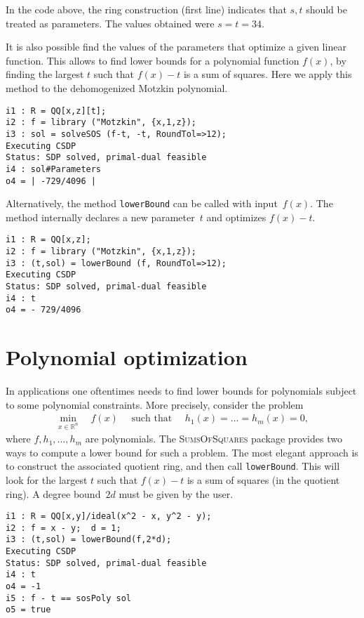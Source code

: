 \documentclass[11pt]{amsart}
\theoremstyle{plain}%
\theoremstyle{definition}
\theoremstyle{remark}
\newcommand{\SOS}{\textsc{SumsOfSquares}\xspace}
\newcommand{\RR}{\mathbb{R}}
\begin{document}
\noindent
In the code above, the ring construction (first line) indicates that $s,t$ should be treated as parameters.
The values obtained were $s=t=34$.

It is also possible find the values of the parameters that optimize a given linear function.
This allows to find lower bounds for a polynomial function $f(x)$,
by finding the largest $t$ such that $f(x)-t$ is a sum of squares.
Here we apply this method to the dehomogenized Motzkin polynomial.

{\small
\begin{verbatim}
i1 : R = QQ[x,z][t];
i2 : f = library ("Motzkin", {x,1,z});
i3 : sol = solveSOS (f-t, -t, RoundTol=>12);
Executing CSDP
Status: SDP solved, primal-dual feasible
i4 : sol#Parameters
o4 = | -729/4096 |
\end{verbatim}
}

\noindent
Alternatively, the method \verb|lowerBound| can be called with input~$f(x)$.
The method internally declares a new parameter~$t$ and optimizes $f(x)-t$.
{\small
\begin{verbatim}
i1 : R = QQ[x,z];
i2 : f = library ("Motzkin", {x,1,z});
i3 : (t,sol) = lowerBound (f, RoundTol=>12);
Executing CSDP
Status: SDP solved, primal-dual feasible
i4 : t
o4 = - 729/4096
\end{verbatim}
}

\section{Polynomial optimization}

In applications one oftentimes needs to find lower bounds for polynomials subject to some polynomial constraints.
More precisely, consider the problem
\begin{align*}
  \min_{x\in \RR^n} \quad f(x)
  \quad \text{ such that }\quad
  h_1(x)=\dots=h_m(x)=0,
\end{align*}
where $f, h_1,\dots,h_m$ are polynomials.
The \SOS package provides two ways to compute a lower bound for such a problem.
The most elegant approach is to construct the associated quotient ring, and then call \verb|lowerBound|.
This will look for the largest $t$ such that $f(x)-t$ is a sum of squares (in the quotient ring).
A degree bound~$2d$ must be given by the user.

{\small
\begin{verbatim}
i1 : R = QQ[x,y]/ideal(x^2 - x, y^2 - y);
i2 : f = x - y;  d = 1;
i3 : (t,sol) = lowerBound(f,2*d);
Executing CSDP
Status: SDP solved, primal-dual feasible
i4 : t
o4 = -1
i5 : f - t == sosPoly sol
o5 = true
\end{verbatim}
}
\end{document}
